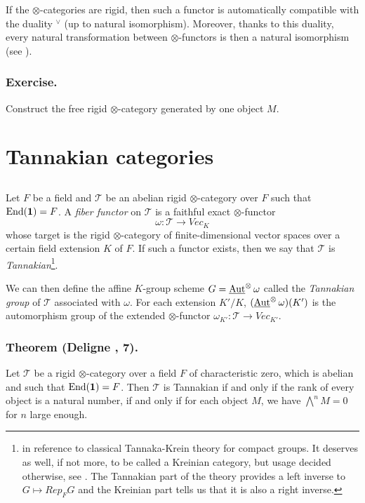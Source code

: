 \documentclass[../main.tex]{subfiles}
\begin{document}
If the $\otimes$-categories are rigid, then such a functor is automatically compatible with the duality $^{\vee}$ (up to natural isomorphism). Moreover, thanks to this duality, every natural transformation between $\otimes$-functors is then a natural isomorphism (see \cite{deligne90}).

\subsubsection{Exercise.} Construct the free rigid $\otimes$-category generated by one object $M$.

\section{Tannakian categories}

\subsection{} Let $F$ be a field and $\mathcal{T}$ be an abelian rigid $\otimes$-category over $F$ such that $\operatorname{End}(\mathbf{1}) = F$.
A \emph{fiber functor} on $\mathcal{T}$ is a faithful exact $\otimes$-functor
$$\omega : \mathcal{T} \to Vec_K$$
whose target is the rigid $\otimes$-category of finite-dimensional vector spaces over a certain field extension $K$ of $F$.
If such a functor exists, then we say that $\mathcal{T}$ is \emph{Tannakian}\footnote{in reference to classical Tannaka-Krein theory for compact groups. It deserves as well, if not more, to be called a Kreinian category, but usage decided otherwise, see \cite{bre94}. The Tannakian part of the theory provides a left inverse to $G \mapsto Rep_F G$ and the Kreinian part tells us that it is also a right inverse.}.

We can then define the affine $K$-group scheme $G = \operatorname{\underline{Aut}}^{\otimes} \omega$ called the \emph{Tannakian group} of $\mathcal{T}$ associated with $\omega$.
For each extension $K'/K$, $(\operatorname{\underline{Aut}}^{\otimes} \omega)(K')$ is the automorphism group of the extended $\otimes$-functor $\omega_{K'} : \mathcal{T} \to Vec_{K'}$.

\subsubsection{Theorem (Deligne \cite{deligne90}, 7).} Let $\mathcal{T}$ be a rigid $\otimes$-category over a field $F$ of characteristic zero, which is abelian and such that $\operatorname{End}(\mathbf{1}) = F$.
Then $\mathcal{T}$ is Tannakian if and only if the rank of every object is a natural number, if and only if for each object $M$, we have $\bigwedge^n M = 0$ for $n$ large enough.
\end{document}
